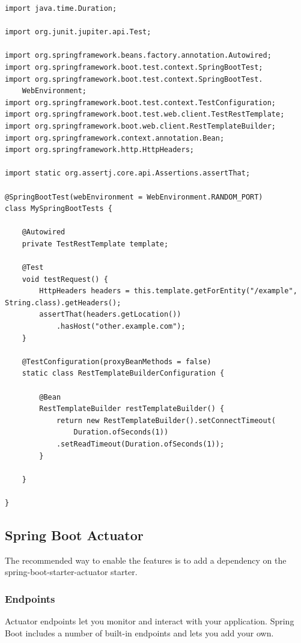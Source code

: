 \documentclass{scrartcl}
\begin{document}
\begin{lstlisting}
import java.time.Duration;

import org.junit.jupiter.api.Test;

import org.springframework.beans.factory.annotation.Autowired;
import org.springframework.boot.test.context.SpringBootTest;
import org.springframework.boot.test.context.SpringBootTest.
    WebEnvironment;
import org.springframework.boot.test.context.TestConfiguration;
import org.springframework.boot.test.web.client.TestRestTemplate;
import org.springframework.boot.web.client.RestTemplateBuilder;
import org.springframework.context.annotation.Bean;
import org.springframework.http.HttpHeaders;

import static org.assertj.core.api.Assertions.assertThat;

@SpringBootTest(webEnvironment = WebEnvironment.RANDOM_PORT)
class MySpringBootTests {

    @Autowired
    private TestRestTemplate template;

    @Test
    void testRequest() {
        HttpHeaders headers = this.template.getForEntity("/example", String.class).getHeaders();
        assertThat(headers.getLocation())
            .hasHost("other.example.com");
    }

    @TestConfiguration(proxyBeanMethods = false)
    static class RestTemplateBuilderConfiguration {

        @Bean
        RestTemplateBuilder restTemplateBuilder() {
            return new RestTemplateBuilder().setConnectTimeout(
                Duration.ofSeconds(1))
            .setReadTimeout(Duration.ofSeconds(1));
        }

    }

}
\end{lstlisting}


\subsection{Spring Boot Actuator}

The recommended way to enable the features is to add a dependency on the spring-boot-starter-actuator starter.

\subsubsection{Endpoints}

Actuator endpoints let you monitor and interact with your application. Spring Boot includes a number of built-in endpoints and lets you add your own.
\end{document}
